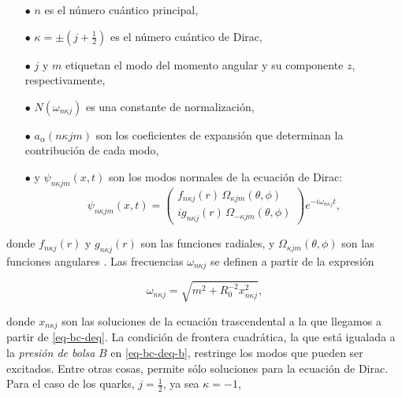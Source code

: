 \begin{itemize}
    \item[$\bullet$] $n$ es el número cuántico principal,
    \item[$\bullet$] $\kappa = \pm (j + \frac{1}{2})$ es el número cuántico de Dirac,
    \item[$\bullet$] $j$ y $m$ etiquetan el modo del momento angular y su componente $z$, respectivamente,
    \item[$\bullet$] $N({\omega}_{n \kappa j})$ es una constante de normalización,
    \item[$\bullet$] ${a}_{\alpha} (n \kappa j m)$ son los coeficientes de expansión que determinan la contribución de cada modo,
    \item[$\bullet$] y ${\psi}_{n \kappa j m} (x, t)$ son los modos normales de la ecuación de Dirac:
    \begin{equation}\label{eq-normal-modes}
        \psi_{n \kappa j m}(x, t) = \begin{pmatrix}
        f_{n \kappa j}(r) \, \Omega_{\kappa j m}(\theta, \phi) \\
        i g_{n \kappa j}(r) \, \Omega_{-\kappa j m}(\theta, \phi)
        \end{pmatrix} e^{-i \omega_{n \kappa j} t},
    \end{equation}
\end{itemize}

donde $f_{n \kappa j}(r)$ y $g_{n \kappa j}(r)$ son las funciones radiales, y $\Omega_{\kappa j m}(\theta, \phi)$ son las funciones angulares \cite{Chodos_1974}. %
Las frecuencias ${\omega}_{n \kappa j}$ se definen a partir de la expresión

\begin{equation}\label{eq-omega}
{\omega}_{n \kappa j} = \sqrt{{m}^{2} + {R}_{0}^{-2} {x}_{n \kappa j}^{2}},
\end{equation}

donde ${x}_{n \kappa j}$ son las soluciones de la ecuación trascendental a la que llegamos a partir de  \eqref{eq-bc-deq}.
La  condición de frontera cuadrática, la que está igualada a la \emph{presión de bolsa} $B$ en \eqref{eq-bc-deq-b}, restringe los modos que pueden ser excitados. Entre otras cosas, permite sólo soluciones para la ecuación de Dirac. Para el caso de los quarks, $j = \frac{1}{2}$, ya sea $\kappa = - 1$,

